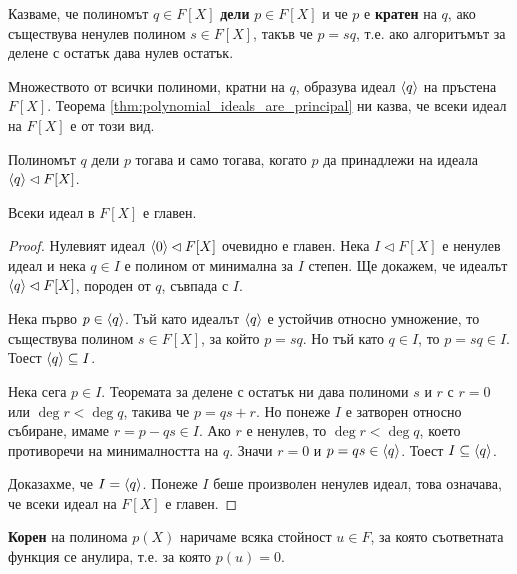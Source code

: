 \documentclass[numbers=endperiod, bibliography=totocnumbered]{scrartcl}
\begin{document}
\begin{definition}
  Казваме, че полиномът \( q \in F[X] \) \textbf{дели} \( p \in F[X] \) и че \( p \) е \textbf{кратен} на \( q \), ако съществува ненулев полином \( s \in F[X] \), такъв че \( p = sq \), т.е. ако алгоритъмът за делене с остатък дава нулев остатък.

  Множеството от всички полиноми, кратни на \( q \), образува идеал \( \left\langle q \right\rangle \) на пръстена \( F[X] \). Теорема \ref{thm:polynomial_ideals_are_principal} ни казва, че всеки идеал на \( F[X] \) е от този вид.

  Полиномът \( q \) дели \( p \) тогава и само тогава, когато \( p \) да принадлежи на идеала \( \left\langle q \right\rangle \lhd F[X] \).
\end{definition}

\begin{theorem}\label{thm:polynomial_ideals_are_principal}
  Всеки идеал в \( F[X] \) е главен.
\end{theorem}
\begin{proof}
  Нулевият идеал \( \left\langle 0 \right\rangle \lhd F[X] \) очевидно е главен. Нека \( I \lhd F[X] \) е ненулев идеал и нека \( q \in I \) е полином от минимална за \( I \) степен. Ще докажем, че идеалът \( \left\langle q \right\rangle \lhd F[X] \), породен от \( q \), съвпада с \( I \).

  Нека първо \( p \in \left\langle q \right\rangle \). Тъй като идеалът \( \left\langle q \right\rangle \) е устойчив относно умножение, то съществува полином \( s \in F[X] \), за който \( p = sq \). Но тъй като \( q \in I \), то \( p = sq \in I \). Тоест \( \left\langle q \right\rangle \subseteq I \).

  Нека сега \( p \in I \). Теоремата за делене с остатък ни дава полиноми \( s \) и \( r \) с \( r = 0 \) или \( \deg r < \deg q \), такива че \( p = qs + r \). Но понеже \( I \) е затворен относно събиране, имаме \( r = p - qs \in I \). Ако \( r \) е ненулев, то \( \deg r < \deg q \), което противоречи на минималността на \( q \). Значи \( r = 0 \) и \( p = qs \in \left\langle q \right\rangle \). Тоест \( I \subseteq \left\langle q \right\rangle \).

  Доказахме, че \( I = \left\langle q \right\rangle \). Понеже \( I \) беше произволен ненулев идеал, това означава, че всеки идеал на \( F[X] \) е главен.
\end{proof}

\begin{definition}
  \textbf{Корен} на полинома \( p(X) \) наричаме всяка стойност \( u \in F \), за която съответната функция се анулира, т.е. за която \( p(u) = 0 \).
\end{definition}
\end{document}
